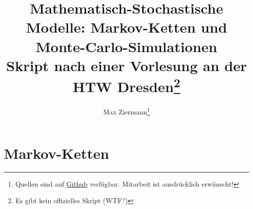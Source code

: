 \documentclass{report}
\title{%
\huge\textbf{Mathematisch-Stochastische Modelle: Markov-Ketten und Monte-Carlo-Simulationen} \\
[2em]\large Skript nach einer Vorlesung an der HTW Dresden\thanks{Es gibt kein
offizielles Skript (WTF?)}}
\author{Max Ziermann\thanks{Quellen sind auf \href{https://github.com/burrscurr/msm}
{Github} verfügbar. Mitarbeit ist ausdrücklich erwünscht!}}
\theoremstyle{lemmastyle}
\begin{document}
  \maketitle

  \tableofcontents

  
  
  

  \chapter{Markov-Ketten}
  
  

  \printbibliography
\end{document}
